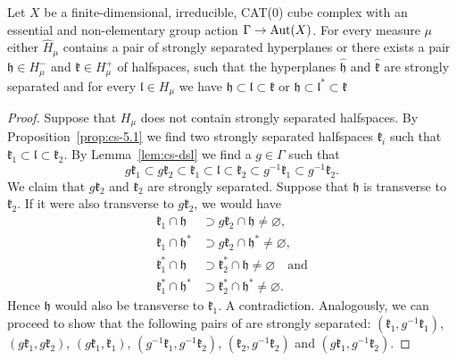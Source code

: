 \begin{lemma}[{\cite[Lemma~4.19]{MR3509968}}]
  \label{lem:4.19}
  Let \(X\) be a finite-dimensional, irreducible, CAT(0) cube complex with an essential and non-elementary group action \(\Gamma \to \operatorname{Aut}(X)\). For every measure \(\mu\) either \(\hat H_\mu\) contains a pair of strongly separated hyperplanes or there exists a pair \(\mathfrak{h} \in H_\mu^-\) and \(\mathfrak{k} \in H_\mu^+\) of halfspaces, such that the hyperplanes \(\mathfrak{\hat h}\) and \(\mathfrak{\hat k}\) are strongly separated and for every \(\mathfrak{l} \in H_\mu\) we have  \(\mathfrak{h} \subset \mathfrak{l} \subset  \mathfrak{k}\) or \(\mathfrak{h} \subset \mathfrak{l}^\ast \subset \mathfrak{k}\)
\end{lemma}

\begin{proof}
  Suppose that \(H_\mu\) does not contain strongly separated halfspaces. By Proposition~\ref{prop:cs-5.1} we find two strongly separated halfspaces \(\mathfrak{k}_i\) such that \(\mathfrak{k}_1 \subset \mathfrak{l} \subset \mathfrak{k}_2\). By Lemma~\ref{lem:cs-dsl} we find a \(g \in \Gamma\) such that
  \[
    g\mathfrak{k}_1 \subset g\mathfrak{k}_2 \subset \mathfrak{k}_1 \subset \mathfrak{l} \subset \mathfrak{k}_2 \subset g^{-1}\mathfrak{k}_1 \subset g^{-1} \mathfrak{k}_2.
  \]
  We claim that \(g\mathfrak{k}_2\) and \(\mathfrak{k}_2\) are strongly separated. Suppose that \(\mathfrak{h}\) is transverse to \(\mathfrak{k}_2\). If it were also transverse to \(g \mathfrak{k}_2\), we would have
  \begin{align*}
    \mathfrak{k}_1 \cap \mathfrak{h} &\supset g\mathfrak{k}_2 \cap \mathfrak{h} \neq \varnothing,\\
    \mathfrak{k}_1 \cap \mathfrak{h}^\ast &\supset g\mathfrak{k}_2 \cap \mathfrak{h}^\ast \neq \varnothing,\\
    \mathfrak{k}_1^\ast \cap \mathfrak{h} &\supset \mathfrak{k}_2^\ast \cap \mathfrak{h} \neq \varnothing \quad \text{and}\\
    \mathfrak{k}_1^\ast \cap \mathfrak{h}^\ast &\supset \mathfrak{k}_2^\ast \cap \mathfrak{h}^\ast \neq \varnothing.
  \end{align*}
  Hence \(\mathfrak{h}\) would also be transverse to \(\mathfrak{k}_1\). A contradiction. Analogously, we can proceed to show that the following pairs of are strongly separated:  \((\mathfrak{k}_1,g^{-1}\mathfrak{k}_1)\), \((g\mathfrak{k}_1, g\mathfrak{k}_2)\), \((g\mathfrak{k}_1, \mathfrak{k}_1)\), \((g^{-1}\mathfrak{k}_1, g^{-1}\mathfrak{k}_2)\), \((\mathfrak{k}_2,g^{-1}\mathfrak{k}_2)\) and \((g\mathfrak{k}_1, g^{-1}\mathfrak{k}_2)\).


\end{proof}
